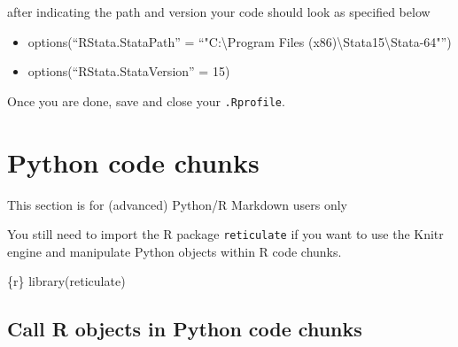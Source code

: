 \documentclass[
  letterpaper,
  DIV=11,
  numbers=noendperiod,
  oneside]{scrreprt}
\newenvironment{Shaded}{\begin{snugshade}}{\end{snugshade}}
\newcommand{\FunctionTok}[1]{\textcolor[rgb]{0.28,0.35,0.67}{#1}}
\newcommand{\InformationTok}[1]{\textcolor[rgb]{0.37,0.37,0.37}{#1}}
\newcommand{\NormalTok}[1]{\textcolor[rgb]{0.00,0.23,0.31}{#1}}
\providecommand{\tightlist}{%
  \setlength{\itemsep}{0pt}\setlength{\parskip}{0pt}}\usepackage{longtable,booktabs,array}
\begin{document}
after indicating the path and version your code should look as specified
below

\begin{itemize}
\tightlist
\item
  options(``RStata.StataPath'' = ``"C:\textbackslash Program Files
  (x86)\textbackslash Stata15\textbackslash Stata-64"'')
\item
  options(``RStata.StataVersion'' = 15)
\end{itemize}

Once you are done, save and close your \texttt{.Rprofile}.

\hypertarget{python-code-chunks}{%
\section{Python code chunks}\label{python-code-chunks}}

\begin{tcolorbox}[enhanced jigsaw, colbacktitle=quarto-callout-warning-color!10!white, titlerule=0mm, breakable, opacityback=0, opacitybacktitle=0.6, left=2mm, coltitle=black, colback=white, title=\textcolor{quarto-callout-warning-color}{\faExclamationTriangle}\hspace{0.5em}{Warning}, rightrule=.15mm, colframe=quarto-callout-warning-color-frame, toprule=.15mm, bottomtitle=1mm, toptitle=1mm, arc=.35mm, bottomrule=.15mm, leftrule=.75mm]
This section is for (advanced) Python/R Markdown users only
\end{tcolorbox}

You still need to import the R package \texttt{reticulate} if you want
to use the Knitr engine and manipulate Python objects within R code
chunks.

\begin{Shaded}
\begin{Highlighting}[]
\InformationTok{\textasciigrave{}\textasciigrave{}\textasciigrave{}\{r\}}
\FunctionTok{library}\NormalTok{(reticulate)}
\InformationTok{\textasciigrave{}\textasciigrave{}\textasciigrave{}}
\end{Highlighting}
\end{Shaded}

\hypertarget{call-r-objects-in-python-code-chunks}{%
\subsection{Call R objects in Python code
chunks}\label{call-r-objects-in-python-code-chunks}}
\end{document}
